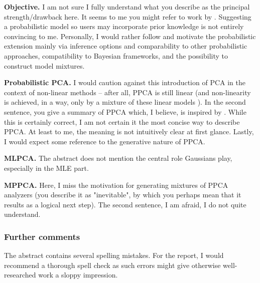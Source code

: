\documentclass[12pt]{article}
\newenvironment{tight_itemize}{
\begin{itemize}
  \setlength{\itemsep}{0pt}
  \setlength{\parskip}{0pt}
}{\end{itemize}}
\begin{document}
\begin{tight_itemize}
  \item \textbf{Objective.} I am not sure I fully understand what you describe 
  as the principal strength/drawback here.
  It seems to me you might refer to work by \citet{shlens2005}. 
  Suggesting a probabilistic model so users may incorporate prior 
  knowledge is not entirely convincing to me.
  Personally, I would rather follow \citet{tippingbishop1999} and motivate the 
  probabilistic extension mainly via inference options and comparability to 
  other probabilistic approaches, compatibility to Bayesian frameworks, and the 
  possibility to construct model mixtures.
  \item \textbf{Probabilistic PCA.} 
  I would caution against this introduction of PCA in the context of non-linear 
  methods -- after all, PPCA is still linear (and non-linearity is achieved, in 
  a way, only by a mixture of these linear models \citep{tippingbishop1999}).
  In the second sentence, you give a summary of PPCA which, I believe, is 
  inspired by \citet{bishop2006}. 
  While this is certainly correct, I am not certain it the most concise way to 
  describe PPCA. 
  At least to me, the meaning is not intuitively clear at first glance.
  Lastly, I would expect some reference to the generative nature of PPCA.
  \item \textbf{MLPCA.} The abstract does not mention the central role Gaussians 
  play, especially in the MLE part. 
  \item \textbf{MPPCA.} Here, I miss the motivation for generating mixtures of 
  PPCA analyzers (you describe it as "inevitable", by which you perhaps mean 
  that it results as a logical next step).
  The second sentence, I am afraid, I do not quite understand.
\end{tight_itemize}

\subsubsection*{Further comments}

The abstract contains several spelling mistakes. 
For the report, I would recommend a thorough spell check as such errors 
might give otherwise well-researched work a sloppy impression.


\RaggedRight


\newpage

\end{document}
